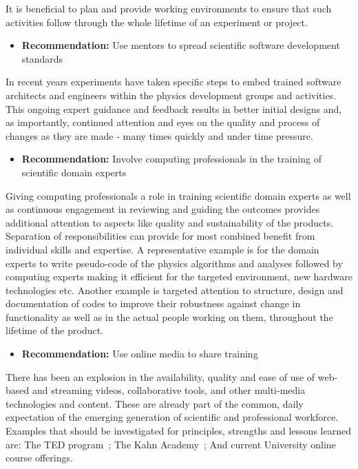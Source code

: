 It is beneficial to plan and provide working environments to ensure
that such activities follow through the whole lifetime of an
experiment or project.

\begin{itemize}
\item[] {\bf Recommendation:} Use mentors to spread scientific software development standards
\end{itemize}

In recent years experiments have taken specific steps to embed
trained software architects and engineers within the physics
development groups and activities. This ongoing expert guidance and
feedback results in better initial designs and, as importantly,
continued attention and eyes on the quality and process of changes
as they are made - many times quickly and under time pressure.

\begin{itemize}
\item[] {\bf Recommendation:} Involve computing professionals in the training of scientific domain experts
\end{itemize}

Giving computing professionals a role in training scientific domain
experts as well as continuous engagement in reviewing and guiding
the outcomes provides additional  attention to aspects like quality
and sustainability of the  products.  Separation of responsibilities
can provide for most combined benefit from individual skills and
expertise.  A representative example is for the domain experts to
write pseudo-code of the physics algorithms and analyses followed
by computing experts making it efficient for the targeted environment,
new hardware technologies etc.  Another example is targeted attention
to structure,  design and documentation of codes to improve their
robustness against change in functionality  as well as in the actual
people  working on them, throughout the lifetime of the product.

\begin{itemize}
\item[] {\bf Recommendation:} Use online media to share training
\end{itemize}

There has been an explosion in the availability, quality and ease
of use of web-based and streaming videos, collaborative tools, and
other multi-media technologies and content. These are already part
of the common, daily expectation of the emerging generation of
scientific and professional workforce. Examples that should be
investigated for principles, strengths and lessons learned are: The
TED program~\cite{TED}; The Kahn Academy~\cite{KHANACAD}; And current
University  online course offerings.

